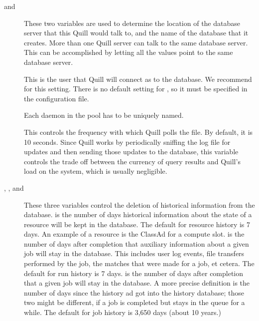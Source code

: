 \begin{description}

\item[ and ]
These two variables are used to determine the location of the database
server that this Quill would talk to, and the name of the database that
it creates.  More than one Quill server can talk to the same database
server.  This can be accomplished by letting all the 
 values point to the same database server.

\item[] 
This is the  user that Quill will connect as to the database.
We recommend  for this setting. 
There is no default setting for , so it must
be specified in the configuration file. 

\item[]
Each  daemon in the pool has to be uniquely named.

\item[]
This controls the frequency with which Quill polls the
 file.  By default, it is 10 seconds.  Since Quill
works by periodically sniffing the log file for updates and then sending
those updates to the database, this variable controls the trade off between
the currency of query results and Quill's load on the system, which
is usually negligible.

\item[ , 
		, and
		]
These three variables control the deletion of historical information from the
database. 
 is the number of days
historical information about the state of a resource will be kept in the 
database. 
The default for resource history is 7 days.
An example of a resource is the ClassAd for a compute slot.
 is the number of days
after completion that auxiliary information about a  given job will stay in 
the database.  
This includes user log events, file transfers performed by the job, the matches
that were made for a job, et cetera. 
The default for run history is 7 days.
 is the number of days
after completion that a given job will stay in the database.  
A more precise definition is the number of days since the history ad got 
into the history database; those two might be different,
if a job is completed but stays in the queue for a while.
The default for job history is 3,650 days (about 10 years.)


\end{description}
